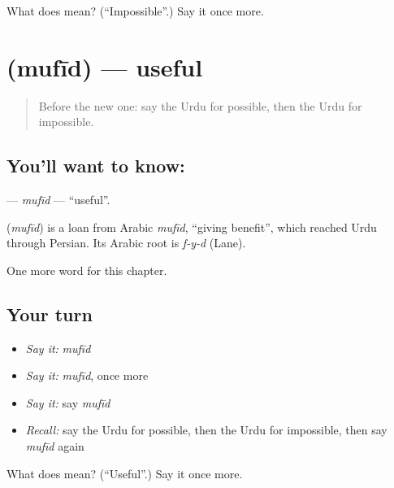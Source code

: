 \begin{tcolorbox}[breakable,colback=teal!4,colframe=teal!35!black,title={Before you move on}]
What does  mean? (\textquotedblleft{}Impossible\textquotedblright{}.) Say it once more.
\end{tcolorbox}
\section[\texorpdfstring{\ur{مفید} (mufīd)}{مفید (mufīd)}]{ (mufīd) — useful}

\label{lesson:UR-C247-mufid}



\begin{quote}
Before the new one: say the Urdu for possible, then the Urdu for impossible.
\end{quote}

\subsection*{You'll want to know: }
\textbf{} — \emph{mufīd} — \textquotedblleft{}useful\textquotedblright{}.

\begin{cousinweb}
\textbf{} (\emph{mufīd}) is a loan from Arabic \emph{mufīd}, \textquotedblleft{}giving benefit\textquotedblright{}, which reached Urdu through Persian. Its Arabic root is \emph{f-y-d} (Lane).
\end{cousinweb}

\begin{grammarlens}[title={What you've built}]
One more word for this chapter.
\end{grammarlens}

\subsection*{Your turn}
\begin{itemize}
\raggedright
  \item \emph{Say it:} \emph{mufīd}
  \item \emph{Say it:} \emph{mufīd}, once more
  \item \emph{Say it:} say \emph{mufīd}
  \item \emph{Recall:} say the Urdu for possible, then the Urdu for impossible, then say \emph{mufīd} again
\end{itemize}

\begin{tcolorbox}[breakable,colback=teal!4,colframe=teal!35!black,title={Before you move on}]
What does  mean? (\textquotedblleft{}Useful\textquotedblright{}.) Say it once more.
\end{tcolorbox}

